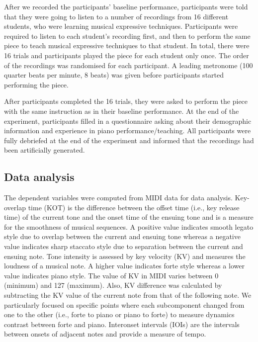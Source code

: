 \documentclass[
  man,floatsintext]{apa6}
\begin{document}
After we recorded the participants' baseline performance, participants were told that they were going to listen to a number of recordings from 16 different students, who were learning musical expressive techniques. Participants were required to listen to each student's recording first, and then to perform the same piece to teach musical expressive techniques to that student. In total, there were 16 trials and participants played the piece for each student only once. The order of the recordings was randomised for each participant. A leading metronome (100 quarter beats per minute, 8 beats) was given before participants started performing the piece.

After participants completed the 16 trials, they were asked to perform the piece with the same instruction as in their baseline performance. At the end of the experiment, participants filled in a questionnaire asking about their demographic information and experience in piano performance/teaching. All participants were fully debriefed at the end of the experiment and informed that the recordings had been artificially generated.

\hypertarget{data-analysis}{%
\subsection{Data analysis}\label{data-analysis}}

The dependent variables were computed from MIDI data for data analysis. Key-overlap time (KOT) is the difference between the offset time (i.e., key release time) of the current tone and the onset time of the ensuing tone and is a measure for the smoothness of musical sequences. A positive value indicates smooth legato style due to overlap between the current and ensuing tone whereas a negative value indicates sharp staccato style due to separation between the current and ensuing note. Tone intensity is assessed by key velocity (KV) and measures the loudness of a musical note. A higher value indicates forte style whereas a lower value indicates piano style. The value of KV in MIDI varies between 0 (minimum) and 127 (maximum). Also, KV difference was calculated by subtracting the KV value of the current note from that of the following note. We particularly focused on specific points where each subcomponent changed from one to the other (i.e., forte to piano or piano to forte) to measure dynamics contrast between forte and piano. Interonset intervals (IOIs) are the intervals between onsets of adjacent notes and provide a measure of tempo.
\end{document}
